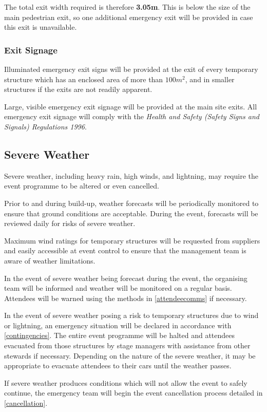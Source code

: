 The total exit width required is therefore \textbf{3.05m}. This is below the size of the
main pedestrian exit, so one additional emergency exit will be provided in case this exit
is unavailable.

\subsubsection{Exit Signage}

Illuminated emergency exit signs will be provided at the exit of every temporary structure which
has an enclosed area of more than $100m^2$, and in smaller structures if the exits are not
readily apparent.

Large, visible emergency exit signage will be provided at the main site exits. All emergency exit
signage will comply with the \textit{Health and Safety (Safety Signs and Signals) Regulations 1996}.

\subsection{Severe Weather}
Severe weather, including heavy rain, high winds, and lightning, may require the event
programme to be altered or even cancelled.

Prior to and during build-up, weather forecasts will be periodically monitored to ensure
that ground conditions are acceptable. During the event, forecasts will be reviewed
daily for risks of severe weather.

Maximum wind ratings for temporary structures will be requested from suppliers and
easily accessible at event control to ensure that the management team is aware of weather
limitations.

In the event of severe weather being forecast during the event, the organising team will
be informed and weather will be monitored on a regular basis. Attendees will be warned
using the methods in \cref{attendeecomms} if necessary.

In the event of severe weather posing a risk to temporary structures due to wind or
lightning, an emergency situation will be declared in accordance with
\cref{contingencies}. The entire event programme will be halted and attendees
evacuated from those structures by stage managers with assistance from other stewards
if necessary. Depending on the nature of the severe weather, it may be appropriate to
evacuate attendees to their cars until the weather passes.

If severe weather produces conditions which will not allow the event to safely continue,
the emergency team will begin the event cancellation process detailed in
\cref{cancellation}.

